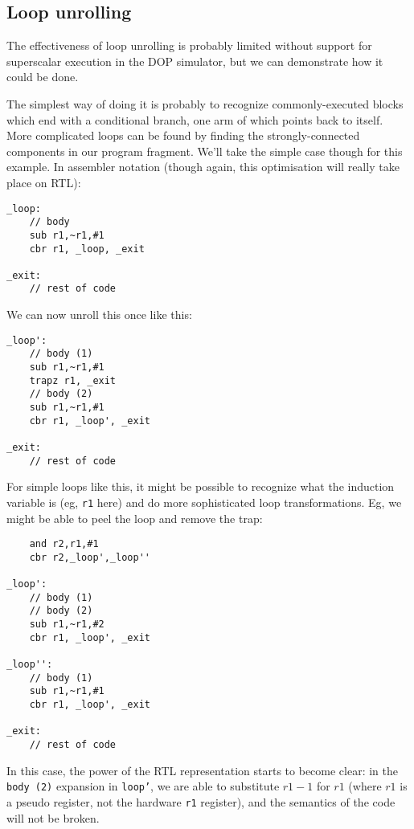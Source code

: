 \subsection{Loop unrolling}

The effectiveness of loop unrolling is probably limited without support for superscalar execution in the DOP simulator, but we can demonstrate how it could be done.

The simplest way of doing it is probably to recognize commonly-executed blocks which end with a conditional branch, one arm of which points back to itself. More complicated loops can be found by finding the strongly-connected components in our program fragment. We'll take the simple case though for this example. In assembler notation (though again, this optimisation will really take place on RTL):

\begin{verbatim}
_loop:
    // body
    sub r1,~r1,#1
    cbr r1, _loop, _exit

_exit:
    // rest of code
\end{verbatim}

We can now unroll this once like this:

\begin{verbatim}
_loop':
    // body (1)
    sub r1,~r1,#1
    trapz r1, _exit
    // body (2)
    sub r1,~r1,#1
    cbr r1, _loop', _exit

_exit:
    // rest of code
\end{verbatim}

For simple loops like this, it might be possible to recognize what the induction variable is (eg, \texttt{r1} here) and do more sophisticated loop transformations. Eg, we might be able to peel the loop and remove the trap:

\begin{verbatim}
    and r2,r1,#1
    cbr r2,_loop',_loop''

_loop':
    // body (1)
    // body (2)
    sub r1,~r1,#2
    cbr r1, _loop', _exit

_loop'':
    // body (1)
    sub r1,~r1,#1
    cbr r1, _loop', _exit

_exit:
    // rest of code
\end{verbatim}

In this case, the power of the RTL representation starts to become clear: in the \texttt{body (2)} expansion in \texttt{loop'}, we are able to substitute $r1-1$ for $r1$ (where $r1$ is a pseudo register, not the hardware \texttt{r1} register), and the semantics of the code will not be broken.


